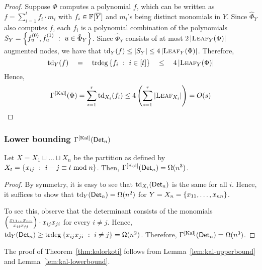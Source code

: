 \documentclass{birkjour}
\newcommand{\CM}[1]{\Gamma^{\mathrm{[#1]}}}
\providecommand{\DIFaddtex}[1]{{\protect\color{blue}\uwave{#1}}} %
\providecommand{\DIFdeltex}[1]{{\protect\color{red}\sout{#1}}}                      %
\providecommand{\DIFaddbegin}{} %
\providecommand{\DIFaddend}{} %
\providecommand{\DIFdelbegin}{} %
\providecommand{\DIFdelend}{} %
\providecommand{\DIFadd}[1]{\texorpdfstring{\DIFaddtex{#1}}{#1}} %
\providecommand{\DIFdel}[1]{\texorpdfstring{\DIFdeltex{#1}}{}} %
\begin{document}
\begin{proof}
  Suppose $\Phi$ computes a polynomial $f$, which can be written as  $f
  = \sum_{i=1}^t f_i\cdot m_i$ with \DIFdelbegin \DIFdel{$f_i \in \mathbb{F}[\overline{Y}]$ }\DIFdelend \DIFaddbegin \DIFadd{$f_i \in \F[X\setminus Y]$ }\DIFaddend and $m_i$'s being
  distinct monomials in $Y$. Since $\hat{\Phi}_Y$ also computes $f$, each $f_i$ is a polynomial
  combination of the polynomials $S_Y = \left\{{f_{u}^{(0)},
    f_{u}^{(1)}}\ : \ {u\in \hat{\Phi}_Y}\right\}$. Since $\hat{\Phi}_Y$ consists of at
  most $2\left|\textsc{Leaf}_Y(\Phi)\right|$ augmented nodes, we have that
  $\mathrm{td}_Y(f) \leq |S_Y| \leq 4\left|\textsc{Leaf}_Y(\Phi)\right|$. Therefore, 
  $$
  \mathrm{td}_Y(f) \quad=\quad \mathrm{trdeg}\left\{{f_i}\ : \ {i\in [t]}\right\} \quad\leq\quad 4\left|\textsc{Leaf}_Y(\Phi)\right|
  $$
  Hence, 
  $$\CM{Kal}(\Phi) = \sum_{i=1}^r \mathrm{td}_{X_i}(f_i) \leq 4\inparen{\sum_{i=1}^r \abs{\textsc{Leaf}_{X_i}}} = O(s)
  $$
\end{proof}

\subsubsection{Lower bounding $\CM{Kal}(\Det_n)$}


\begin{lemma}\label{lem:kal-lowerbound}
  Let $X = X_1 \sqcup \dots \sqcup X_n$ be the partition as defined by
  $X_t = \left\{{x_{ij}}\ : \ {i-j\equiv t\bmod{n}}\right\}$. Then,
  $\CM{Kal}(\Det_n) = \Omega(n^3)$.
\end{lemma}
\begin{proof}
  By symmetry, it is easy to see that $\text{td}_{X_i}(\mathsf{Det}_n)$ is
  the same for all $i$. Hence, it suffices to show that
  $\text{td}_{Y}(\mathsf{Det}_n) = \Omega(n^2)$ for $Y = X_n = \left\{x_{11},\dots, x_{nn}\right\}$. 

  To see this, observe that the determinant consists of the monomials
  $\left(\frac{x_{11}\dots x_{nn}}{x_{ii}x_{jj}}\right)\cdot
  x_{ij}x_{ji}$ for every $i\neq j$. Hence, $\text{td}_{Y}(\mathsf{Det}_n)
  \geq \mathrm{trdeg}\left\{{x_{ij}x_{ji}}\ : \ {i\neq j}\right\} =
  \Omega(n^2)$. Therefore, $\CM{Kal}(\Det_n) =
  \Omega(n^3)$.
\end{proof}

The proof of Theorem~\ref{thm:kalorkoti} follows from
Lemma~\ref{lem:kal-upperbound} and Lemma~\ref{lem:kal-lowerbound}.


\end{document}

